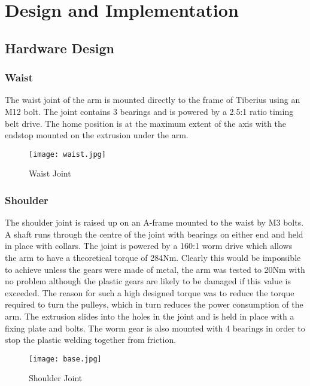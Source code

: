 \section{Design and Implementation}

\subsection{Hardware Design}


\subsubsection{Waist}
The waist joint of the arm is mounted directly to the frame of Tiberius using an M12 bolt. The joint contains 3 bearings and is powered by a 2.5:1 ratio timing belt drive. The home position is at the maximum extent of the axis with the endstop mounted on the extrusion under the arm.

\begin{figure}[!htb]
\begin{center}
\texttt{[image: waist.jpg]}
\end{center}
\caption{Waist Joint}
\label{fig:waist}
\end{figure}

\subsubsection{Shoulder}
The shoulder joint is raised up on an A-frame mounted to the waist by M3 bolts. A shaft runs through the centre of the joint with bearings on either end and held in place with collars. The joint is powered by a 160:1 worm drive which allows the arm to have a theoretical torque of 284Nm. Clearly this would be impossible to achieve unless the gears were made of metal, the arm was tested to 20Nm with no problem although the plastic gears are likely to be damaged if this value is exceeded. The reason for such a high designed torque was to reduce the torque required to turn the pulleys, which in turn reduces the power consumption of the arm. The extrusion slides into the holes in the joint and is held in place with a fixing plate and bolts. The worm gear is also mounted with 4 bearings in order to stop the plastic welding together from friction.

\begin{figure}[!htb]
\begin{center}
\texttt{[image: base.jpg]}
\end{center}
\caption{Shoulder Joint}
\label{fig:shoulder}
\end{figure}

